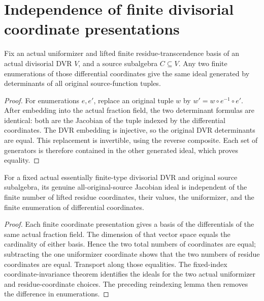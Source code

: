 \section{Independence of finite divisorial coordinate presentations}

\begin{lemma}\label{lem:sc0-dvr-jacobian-finite-reindex}
\leanok
{}
Fix an actual uniformizer and lifted finite residue-transcendence basis of an
actual divisorial DVR $V$, and a source subalgebra $C\subseteq V$. Any two
finite enumerations of those differential coordinates give the same ideal
generated by determinants of all original source-function tuples.
\end{lemma}
\begin{proof}
For enumerations $e,e'$, replace an original tuple $w$ by
$w'=w\circ e^{-1}\circ e'$. After embedding into the actual fraction field,
the two determinant formulas are identical: both are the Jacobian of the
tuple indexed by the differential coordinates. The DVR embedding is
injective, so the original DVR determinants are equal. This replacement is
invertible, using the reverse composite. Each set of generators is therefore
contained in the other generated ideal, which proves equality.
\end{proof}

\begin{theorem}\label{thm:sc0-dvr-jacobian-presentation-independent}
\leanok
{}
For a fixed actual essentially finite-type divisorial DVR and original
source subalgebra, its genuine all-original-source Jacobian ideal is
independent of the finite number of lifted residue coordinates, their
values, the uniformizer, and the finite enumeration of differential
coordinates.
\end{theorem}
\begin{proof}
Each finite coordinate presentation gives a basis of the differentials of
the same actual fraction field. The dimension of that vector space equals
the cardinality of either basis. Hence the two total numbers of coordinates
are equal; subtracting the one uniformizer coordinate shows that the two
numbers of residue coordinates are equal. Transport along those equalities.
The fixed-index coordinate-invariance theorem identifies the ideals for the
two actual uniformizer and residue-coordinate choices. The preceding
reindexing lemma then removes the difference in enumerations.
\end{proof}

